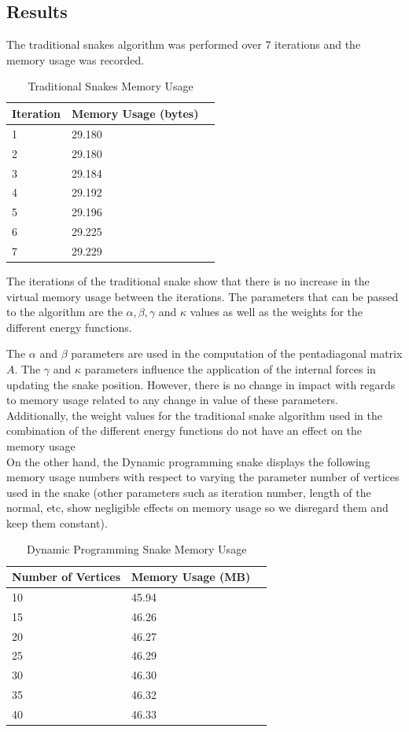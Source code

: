 \documentclass[twoside]{article}
\begin{document}
\begin{multicols}{2}

\section{Results}

The traditional snakes algorithm was performed over 7 iterations and the memory usage was recorded.
\begin{table}[H]
\caption{Traditional Snakes Memory Usage}
\centering
\begin{tabular}{llr}
\toprule
\cmidrule(r){1-2}
Iteration & Memory Usage (bytes) \\
\midrule
1 & 29.180 \\
2 & 29.180 \\
3 & 29.184 \\
4 & 29.192 \\
5 & 29.196 \\
6 & 29.225 \\
7 & 29.229 \\
\bottomrule
\end{tabular}
\end{table}

The iterations of the traditional snake show that there is no increase in the virtual memory usage between the iterations. The parameters that can be passed to the algorithm are the
$\alpha, \beta, \gamma$ and $\kappa$ values as well as the weights for the different energy functions. \par
The $\alpha$ and $\beta$ parameters are used in the computation of the pentadiagonal matrix $A$. The $\gamma$ and $\kappa$ parameters influence the application of the internal forces in updating
the snake position. However, there is no change in impact with regards to memory usage related to any change in value of these parameters. Additionally, the weight values for the traditional
snake algorithm used in the combination of the different energy functions do not have an effect on the memory usage \\

On the other hand, the Dynamic programming snake displays the following memory usage numbers with respect to varying the parameter number of vertices used in the snake (other parameters such as iteration number, length of the normal, etc, show negligible effects on memory usage so we disregard them and keep them constant).

\begin{table}[H]
\caption{Dynamic Programming Snake Memory Usage}
\centering
\begin{tabular}{llr}
\toprule
\cmidrule(r){1-2}
Number of Vertices & Memory Usage (MB) \\
\midrule
10 & 45.94 \\
15 & 46.26 \\
20 & 46.27 \\
25 & 46.29 \\
30 & 46.30 \\
35 & 46.32 \\
40 & 46.33 \\
\bottomrule
\end{tabular}
\end{table}


\end{multicols}
\end{document}
